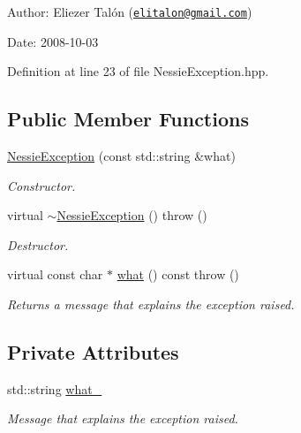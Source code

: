 \begin{Desc}
\item[Author:]Eliezer Talón (\href{mailto:elitalon@gmail.com}{\tt elitalon@gmail.com}) \end{Desc}
\begin{Desc}
\item[Date:]2008-10-03 \end{Desc}


Definition at line 23 of file NessieException.hpp.\subsection*{Public Member Functions}
\begin{CompactItemize}
\item 
\hyperlink{class_nessie_exception_80c86c892438045635bf6a99da17e859}{NessieException} (const std::string \&what)
\begin{CompactList}\small\item\em Constructor. \item\end{CompactList}\item 
virtual \hyperlink{class_nessie_exception_19f44d2725dd53e2f10505a88e5773f2}{$\sim$NessieException} ()  throw ()
\begin{CompactList}\small\item\em Destructor. \item\end{CompactList}\item 
virtual const char $\ast$ \hyperlink{class_nessie_exception_a522c2ea164e88be0b26670170b33909}{what} () const   throw ()
\begin{CompactList}\small\item\em Returns a message that explains the exception raised. \item\end{CompactList}\end{CompactItemize}
\subsection*{Private Attributes}
\begin{CompactItemize}
\item 
\hypertarget{class_nessie_exception_3464c36d30d9baabd0b10ac4797d4b5b}{
std::string \hyperlink{class_nessie_exception_3464c36d30d9baabd0b10ac4797d4b5b}{what\_\-}}
\label{class_nessie_exception_3464c36d30d9baabd0b10ac4797d4b5b}

\begin{CompactList}\small\item\em Message that explains the exception raised. \item\end{CompactList}\end{CompactItemize}


